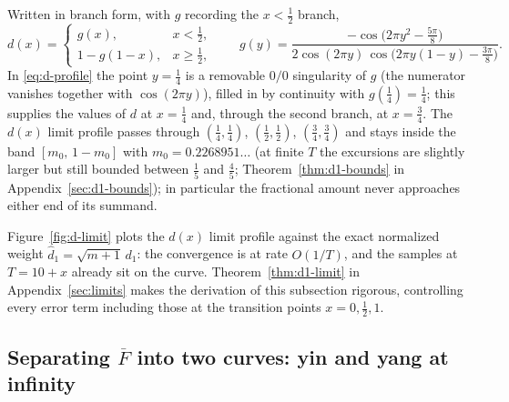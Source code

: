 \documentclass[11pt]{article}
\theoremstyle{definition}
\begin{document}
Written in branch form, with $g$ recording the $x<\tfrac12$ branch,
\begin{equation}\label{eq:d-profile}
d(x)=
\begin{cases}
g(x), & x<\tfrac12,\\[2pt]
1-g(1-x), & x\ge\tfrac12,
\end{cases}
\qquad
g(y)=\frac{-\cos\bigl(2\pi y^{2}-\tfrac{5\pi}{8}\bigr)}
{2\cos(2\pi y)\,\cos\bigl(2\pi y(1-y)-\tfrac{3\pi}{8}\bigr)}.
\end{equation}
In \eqref{eq:d-profile} the point $y=\tfrac14$ is a
removable $0/0$ singularity of $g$ (the numerator vanishes together with
$\cos(2\pi y)$), filled in by continuity with $g(\tfrac14)=\tfrac14$;
this supplies the values of $d$ at $x=\tfrac14$ and, through the second
branch, at $x=\tfrac34$. The $d(x)$ limit profile passes
through $(\tfrac14,\tfrac14)$, $(\tfrac12,\tfrac12)$,
$(\tfrac34,\tfrac34)$ and stays inside the band $[m_0,\,1-m_0]$ with
$m_0=0.2268951\ldots$ (at finite $T$ the excursions are slightly
larger but still bounded between $\tfrac15$ and $\tfrac45$;
Theorem~\ref{thm:d1-bounds} in Appendix~\ref{sec:d1-bounds}); in particular
the fractional amount never
approaches either end of its summand.

Figure~\ref{fig:d-limit} plots the $d(x)$ limit profile against the
exact normalized weight $\hat d_1=\sqrt{m+1}\,d_1$: the convergence is
at rate $O(1/T)$, and the samples at $T=10+x$
already sit on the curve. Theorem~\ref{thm:d1-limit} in
Appendix~\ref{sec:limits} makes the derivation of this subsection rigorous,
controlling every error term including those at the transition points
$x=0,\tfrac12,1$.

\subsection{Separating \texorpdfstring{$\overline F$}{F bar} into two
curves: yin and yang at infinity}\label{sec:yinyang-inf}
\end{document}
